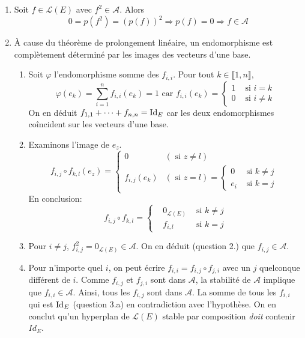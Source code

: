 \begin{enumerate}
  \item Soit $f\in \mathcal{L}(E)$ avec $f^{2}\in \mathcal{A}$. Alors
\begin{displaymath}
0 = p(f^{2})= (p(f))^2  \Rightarrow p(f)=0 \Rightarrow f\in\mathcal{A}
\end{displaymath}

  \item \`A cause du théorème de prolongement linéaire, un endomorphisme est complètement déterminé par les images des vecteurs d'une base.
\begin{enumerate}
\item Soit $\varphi$ l'endomorphisme somme des $f_{i,i}$. Pour tout $k\in\llbracket 1,n \rrbracket$,
\begin{displaymath}
  \varphi(e_k) = \sum_{i=1}^{n}f_{i,i}(e_k) = 1 \text{ car }
f_{i,i}(e_k) = 
\left\lbrace 
\begin{aligned}
 1 &\text{ si } i= k \\ 0 &\text{ si } i\neq k  
\end{aligned}
\right. 
\end{displaymath}
On en déduit $f_{1,1} + \cdots + f_{n,n} = \operatorname{Id}_E$ car les deux endomorphismes coîncident sur les vecteurs d'une base.
\item Examinons l'image de $e_z$.
\begin{displaymath}
f_{i,j}\circ f_{k,l}(e_z)=
\left\lbrace 
  \begin{aligned}
    0            &(\text{ si } z\neq l) \\
    f_{i,j}(e_k) &(\text{ si } z=l)
    =
      \left\lbrace 
        \begin{aligned}
          0  &\text{ si } k\neq j\\
          e_i&\text{ si } k = j
        \end{aligned}
      \right.
  \end{aligned}
\right. 
\end{displaymath}
En conclusion:
\begin{displaymath}
f_{i,j}\circ f_{k,l} = 
\left\lbrace 
\begin{aligned}
&0_{\mathcal{L}(E)} &\text{ si } k\neq j \\
&f_{i,l} &\text{ si } k = j 
\end{aligned}
\right. 
\end{displaymath}

\item Pour $i\neq j$, $f_{i,j}^{2}=0_{\mathcal{L}(E)}\in \mathcal{A}$. On en d\'{e}duit (question 2.) que $f_{i,j}\in \mathcal{A}$.

\item Pour n'importe quel $i$, on peut \'{e}crire $f_{i,i}=f_{i,j}\circ f_{j,i}$ avec un $j$ quelconque différent de $i$. Comme $f_{i,j}$ et $f_{j,i}$ sont dans $\mathcal{A}$, la stabilit\'{e} de $\mathcal{A}$ implique que $f_{i,i}\in \mathcal{A}$. Ainsi, tous les $f_{i,j}$ sont dans $\mathcal{A}$. La somme de tous les $f_{i,i}$ qui est $\operatorname{Id}_E$ (question 3.a) en contradiction avec l'hypothèse.\newline
On en conclut qu'un hyperplan de $\mathcal{L}(E)$ stable par composition \emph{doit} contenir $Id_{E}$.
\end{enumerate}
\end{enumerate}
